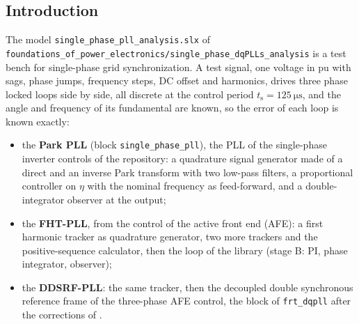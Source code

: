 \documentclass[11pt,a4paper]{scrartcl}
\newcommand{\ped}[1]{_{\mathrm{#1}}}
\newcommand{\code}[1]{\texttt{#1}}
\newcommand{\us}{\_\allowbreak}  %
\begin{document}
\begin{onehalfspace}
\section{Introduction}
\label{sec:intro}

The model \code{single\_phase\_pll\_analysis.slx} of \code{foundations\us of\us power\us electronics/\allowbreak single\us phase\us dqPLLs\us analysis} \cite{model_repo} is a test bench for single-phase grid synchronization. A test signal, one voltage in pu with sags, phase jumps, frequency steps, DC offset and harmonics, drives three phase locked loops side by side, all discrete at the control period $t\ped{s} = \SI{125}{\micro\second}$, and the angle and frequency of its fundamental are known, so the error of each loop is known exactly:
\begin{itemize}[nosep]
	\item the \textbf{Park PLL} (block \code{single\_phase\_pll}), the PLL of the single-phase inverter controls of the repository: a quadrature signal generator made of a direct and an inverse Park transform with two low-pass filters, a proportional controller on $\eta$ with the nominal frequency as feed-forward, and a double-integrator observer at the output;
	\item the \textbf{FHT-PLL}, from the control of the active front end (AFE): a first harmonic tracker as quadrature generator, two more trackers and the positive-sequence calculator, then the loop of the library (stage B: PI, phase integrator, observer);
	\item the \textbf{DDSRF-PLL}: the same tracker, then the decoupled double synchronous reference frame of the three-phase AFE control, the block of \code{frt\_dqpll} after the corrections of \cite{note_3ph}.
\end{itemize}


\end{onehalfspace}
\end{document}
